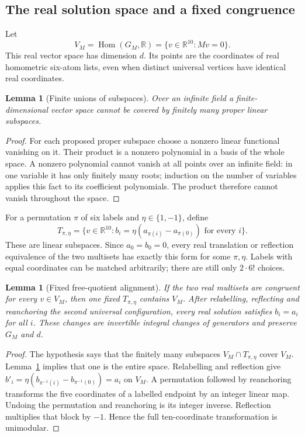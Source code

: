 \documentclass[11pt]{article}
\newtheorem{lemma}[theorem]{Lemma}
\theoremstyle{remark}
\newcommand{\R}{\mathbb R}
\newcommand{\Hom}{\operatorname{Hom}}
\begin{document}
\subsection{The real solution space and a fixed congruence}
Let
\[
 V_M=\Hom(G_M,\R)=\{v\in\R^{10}:Mv=0\}.
\]
This real vector space has dimension $d$. Its points are the coordinates
of real homometric six-atom lists, even when distinct universal vertices
have identical real coordinates.

\begin{lemma}[Finite unions of subspaces]\label{lem:finite-subspaces}
Over an infinite field a finite-dimensional vector space cannot be covered
by finitely many proper linear subspaces.
\end{lemma}
\begin{proof}
For each proposed proper subspace choose a nonzero linear functional
vanishing on it. Their product is a nonzero polynomial in a basis of the
whole space. A nonzero polynomial cannot vanish at all points over an
infinite field: in one variable it has only finitely many roots; induction
on the number of variables applies this fact to its coefficient
polynomials. The product therefore cannot vanish throughout the space.
\end{proof}

For a permutation $\pi$ of six labels and $\eta\in\{1,-1\}$, define
\[
 T_{\pi,\eta}=\{v\in\R^{10}:
  b_i=\eta(a_{\pi(i)}-a_{\pi(0)})\text{ for every }i\}.
\]
These are linear subspaces. Since $a_0=b_0=0$, every real translation or
reflection equivalence of the two multisets has exactly this form for
some $\pi,\eta$. Labels with equal coordinates can be matched arbitrarily;
there are still only $2\cdot6!$ choices.

\begin{lemma}[Fixed free-quotient alignment]\label{lem:fixed-alignment}
If the two real multisets are congruent for every $v\in V_M$, then one
fixed $T_{\pi,\eta}$ contains $V_M$. After relabelling, reflecting and
reanchoring the second universal configuration, every real solution
satisfies $b_i=a_i$ for all $i$. These changes are invertible integral
changes of generators and preserve $G_M$ and $d$.
\end{lemma}
\begin{proof}
The hypothesis says that the finitely many subspaces
$V_M\cap T_{\pi,\eta}$ cover $V_M$. Lemma~\ref{lem:finite-subspaces}
implies that one is the entire space. Relabelling and reflection give
$b'_i=\eta(b_{\pi^{-1}(i)}-b_{\pi^{-1}(0)})=a_i$ on $V_M$.
A permutation followed by reanchoring transforms the five coordinates
of a labelled endpoint by an integer linear map. Undoing the permutation
and reanchoring is its integer inverse. Reflection multiplies that block
by $-1$. Hence the full ten-coordinate transformation is unimodular.
\end{proof}
\end{document}

